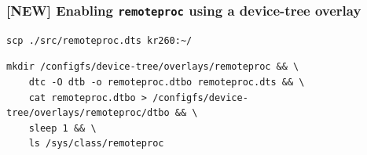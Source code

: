\documentclass[10pt]{article}
\begin{document}
\subsubsection{[NEW] Enabling \texttt{remoteproc} using a device-tree overlay}
\label{sec:org86e7521}


\begin{verbatim}
scp ./src/remoteproc.dts kr260:~/
\end{verbatim}


\begin{verbatim}
mkdir /configfs/device-tree/overlays/remoteproc && \
    dtc -O dtb -o remoteproc.dtbo remoteproc.dts && \
    cat remoteproc.dtbo > /configfs/device-tree/overlays/remoteproc/dtbo && \
    sleep 1 && \
    ls /sys/class/remoteproc
\end{verbatim}
\end{document}
